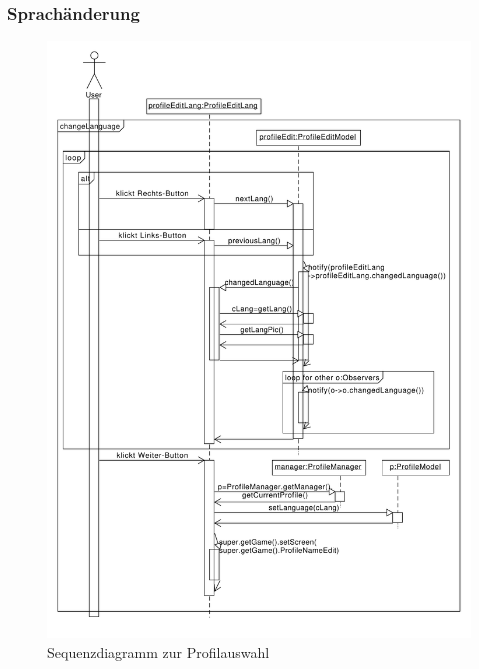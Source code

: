 \subsubsection{Sprachänderung}
\begin{figure}[H]
\centering
\includegraphics[scale=0.50]{./sections/sequence_diagrams/profile_scenarios/ProfileSprachauswahl.pdf}
\caption{Sequenzdiagramm zur Profilauswahl}
\end{figure}

